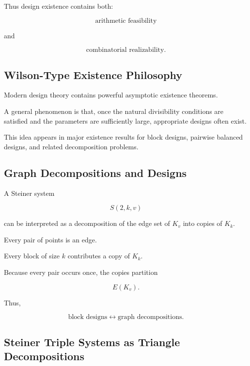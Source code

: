 Thus design existence contains both:

\[
\boxed{
\text{arithmetic feasibility}
}
\]

and

\[
\boxed{
\text{combinatorial realizability}.
}
\]

\subsection{Wilson-Type Existence Philosophy}
\label{subsec:wilson-existence-preview}

Modern design theory contains powerful asymptotic existence theorems.

A general phenomenon is that, once the natural divisibility conditions
are satisfied and the parameters are sufficiently large, appropriate
designs often exist.

This idea appears in major existence results for block designs,
pairwise balanced designs, and related decomposition problems.

\subsection{Graph Decompositions and Designs}
\label{subsec:graph-decompositions-designs}

A Steiner system

\[
S(2,k,v)
\]

can be interpreted as a decomposition of the edge set of \(K_v\) into
copies of \(K_k\).

Every pair of points is an edge.

Every block of size \(k\) contributes a copy of \(K_k\).

Because every pair occurs once, the copies partition

\[
E(K_v).
\]

Thus,

\[
\boxed{
\text{block designs}
\longleftrightarrow
\text{graph decompositions}.
}
\]

\subsection{Steiner Triple Systems as Triangle Decompositions}
\label{subsec:sts-triangle-decomposition}

